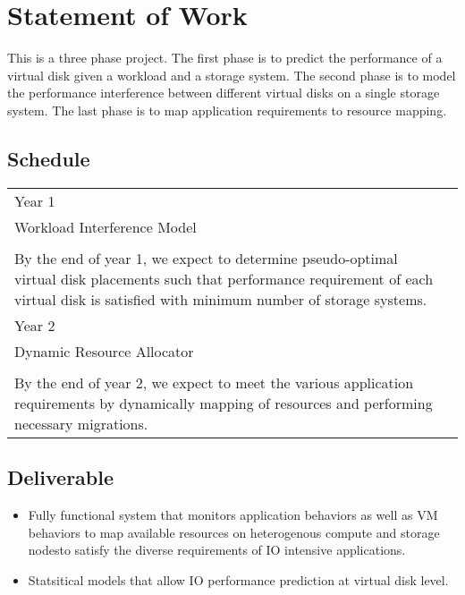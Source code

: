 \section{Statement of Work}
\label{plan}
%
This is a three phase project. The first phase is to predict the performance of a virtual disk given a workload and a storage system. The second phase is to model the performance interference between different virtual disks on a single storage system. The last phase is to map application requirements to resource mapping. 

\subsection{Schedule}
%
\bigskip
\begin{tabular}{l|l}
\hspace{.25in} Year 1 \hspace{.25in} & 
\begin{minipage}{5in}
  Virtual Disk Performance Model\\
	Workload Interference Model\\
  \\
  By the end of year 1, we expect to determine pseudo-optimal virtual disk placements such that performance requirement of each virtual disk is satisfied with minimum number of storage systems.
\medskip
\end{minipage}\\
\hline
\hspace{.25in} Year 2 & 
\begin{minipage}{5in}
  \medskip
  Application Performance Monitor\\
	Dynamic Resource Allocator\\
  \\
  By the end of year 2, we expect to meet the various application requirements by dynamically mapping of resources and performing necessary migrations. 
\medskip
\end{minipage}\\
\end{tabular}

\subsection{Deliverable} 
\label{deliverable} 
%
\begin{itemize}
\item Fully functional system that monitors application behaviors as well as VM behaviors to map available resources on heterogenous compute and storage nodesto satisfy the diverse requirements of IO intensive applications. 
\item Statsitical models that allow IO performance prediction at virtual disk level. 
\end{itemize}
